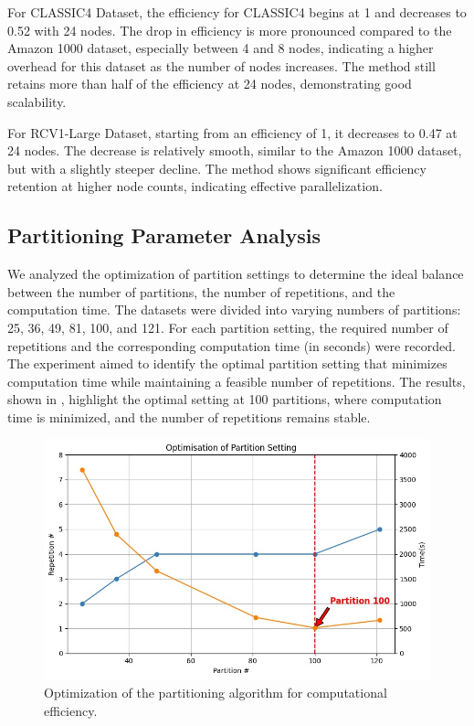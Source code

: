 \documentclass[journal]{IEEEtran}
\begin{document}
For CLASSIC4 Dataset, the efficiency for CLASSIC4 begins at 1 and decreases to 0.52 with 24 nodes. The drop in efficiency is more pronounced compared to the Amazon 1000 dataset, especially between 4 and 8 nodes, indicating a higher overhead for this dataset as the number of nodes increases. The method still retains more than half of the efficiency at 24 nodes, demonstrating good scalability.

For RCV1-Large Dataset, starting from an efficiency of 1, it decreases to 0.47 at 24 nodes. The decrease is relatively smooth, similar to the Amazon 1000 dataset, but with a slightly steeper decline. The method shows significant efficiency retention at higher node counts, indicating effective parallelization.

\subsection{Partitioning Parameter Analysis}
We analyzed the optimization of partition settings to determine the ideal balance between the number of partitions, the number of repetitions, and the computation time. The datasets were divided into varying numbers of partitions: 25, 36, 49, 81, 100, and 121. For each partition setting, the required number of repetitions and the corresponding computation time (in seconds) were recorded. The experiment aimed to identify the optimal partition setting that minimizes computation time while maintaining a feasible number of repetitions. The results, shown in , highlight the optimal setting at 100 partitions, where computation time is minimized, and the number of repetitions remains stable.

\begin{figure}[htbp]
    \centering
    \includegraphics[width=0.8\linewidth]{optimisation.jpg}
    \caption{Optimization of the partitioning algorithm for computational efficiency.}
    \label{fig:optimisation}
\end{figure}
\end{document}
